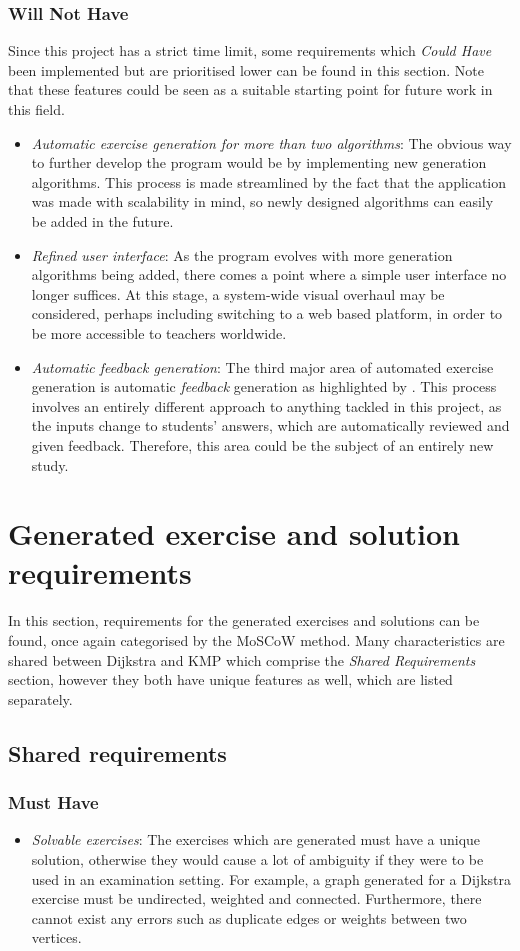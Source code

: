 \documentclass{l4proj}
\begin{document}
\subsubsection{Will Not Have}
Since this project has a strict time limit, some requirements which \emph{Could Have} been implemented but are prioritised lower can be found in this section. Note that these features could be seen as a suitable starting point for future work in this field.
\begin{itemize}
	\item
	\emph{Automatic exercise generation for more than two algorithms}: The obvious way to further develop the program would be by implementing new generation algorithms. This process is made streamlined by the fact that the application was made with scalability in mind, so newly designed algorithms can easily be added in the future.
	\item
	\emph{Refined user interface}: As the program evolves with more generation algorithms being added, there comes a point where a simple user interface no longer suffices. At this stage, a system-wide visual overhaul may be considered, perhaps including switching to a web based platform, in order to be more accessible to teachers worldwide. 
	\item
	\emph{Automatic feedback generation}: The third major area of automated exercise generation is automatic \emph{feedback} generation as highlighted by \cite{}. This process involves an entirely different approach to anything tackled in this project, as the inputs change to students' answers, which are automatically reviewed and given feedback. Therefore, this area could be the subject of an entirely new study.
\end{itemize}
\section{Generated exercise and solution requirements}

In this section, requirements for the generated exercises and solutions can be found, once again categorised by the MoSCoW method. Many characteristics are shared between Dijkstra and KMP which comprise the \emph{Shared Requirements} section, however they both have unique features as well, which are listed separately.

\subsection{Shared requirements}
\subsubsection{Must Have}
\begin{itemize}
	\item
	\emph{Solvable exercises}: The exercises which are generated must have a unique solution, otherwise they would cause a lot of ambiguity if they were to be used in an examination setting. For example, a graph generated for a Dijkstra exercise must be undirected, weighted and connected. Furthermore, there cannot exist any errors such as duplicate edges or weights between two vertices.
\end{itemize}
\end{document}
